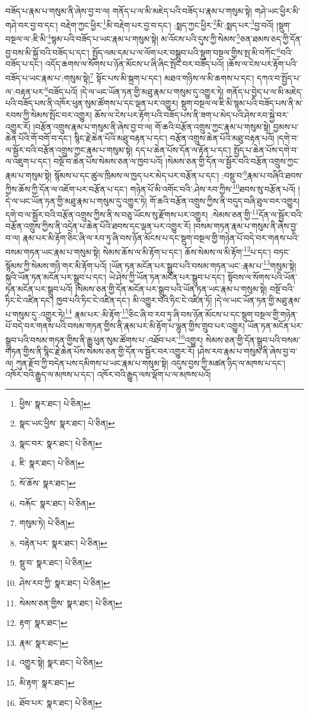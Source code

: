 བཟོད་པ་རྣམ་པ་གསུམ་ནི་ཞེས་བྱ་བ་ལ། གནོད་པ་ལ་མི་མཇེད་པའི་བཟོད་པ་རྣམ་པ་གསུམ་སྟེ། གཤེ་ཡང་ཕྱིར་མི་གཤེ་བར་བྱ་བ་དང་། བརྡེག་ཀྱང་ཕྱིར་\footnote{ཕྱིས་  སྣར་ཐང་།  པེ་ཅིན། }མི་བརྡེག་པར་བྱ་བ་དང་། :སྨད་ཀྱང་ཕྱིར་\footnote{སྣང་ཡང་ཕྱིས་  སྣར་ཐང་།  པེ་ཅིན། }མི་:སྨད་པར་\footnote{སྣང་བར་  སྣར་ཐང་།  པེ་ཅིན། }བྱ་བའོ། །སྡུག་བསྔལ་ལ་:ཇི་མི་\footnote{ཇི་  སྣར་ཐང་།  པེ་ཅིན། }སྙམ་པའི་བཟོད་པ་ཡང་རྣམ་པ་གསུམ་སྟེ། མ་འོངས་པའི་དུས་ཀྱི་སེམས་\footnote{སོ་ཆོས་  སྣར་ཐང་། }ཅན་ཐམས་ཅད་ཀྱི་དོན་བྱ་བས་མི་སྐྱོ་བའི་བཟོད་པ་དང་། སྤྱོད་ལམ་དམ་པ་ལ་ལོག་པར་བསྒྲུབ་པའི་སྡུག་བསྔལ་གྱིས་སྤ་མི་བཀོང་\footnote{བརྐོང་  སྣར་ཐང་།  པེ་ཅིན། }བའི་བཟོད་པ་དང་། འདོད་ཆགས་ལ་སོགས་པ་ཉོན་མོངས་པ་ཞི་ཞིང་སྤོང་བར་བཟོད་པའོ། །ཆོས་ལ་ངེས་པར་རྟོག་པའི་བཟོད་པ་ཡང་རྣམ་པ་:གསུམ་སྟེ།\footnote{གསུམ་ཏེ།  པེ་ཅིན། } སྟོང་པས་མི་སྐྲག་པ་དང་། མཐའ་གཉིས་ལ་མི་ཆགས་པ་དང་། དཀའ་བ་སྤྱོད་པ་ལ་:བརྟན་པར་\footnote{བརྟེན་པར་  སྣར་ཐང་།  པེ་ཅིན། }བཟོད་པའོ། །དེ་ལ་ཡང་ཡོན་ཏན་གྱི་མཐུ་རྣམ་པ་གསུམ་དུ་འགྱུར་ཏེ། གནོད་པ་བྱེད་པ་ལ་མི་མཇེད་པའི་བཟོད་པས་ནི་འཁོར་ཕུན་སུམ་ཚོགས་པ་དང་ལྡན་པར་འགྱུར། སྡུག་བསྔལ་ལ་ཇི་མི་སྙམ་པའི་བཟོད་པས་ནི་མ་རབས་ཀྱི་སེམས་སྤོང་བར་འགྱུར། ཆོས་ལ་ངེས་པར་རྟོག་པའི་བཟོད་པས་ནི་ཟག་པ་མེད་པའི་ཤེས་རབ་སྐྱེ་བར་འགྱུར་རོ། །བརྩོན་འགྲུས་རྣམ་པ་གསུམ་ནི་ཞེས་བྱ་བ་ལ། གོ་ཆའི་བརྩོན་འགྲུས་ཀྱང་རྣམ་པ་གསུམ་སྟེ། བྱམས་པ་ཆེན་པོའི་གོ་བགོ་བ་དང་། སྙིང་རྗེ་ཆེན་པོའི་མཐུ་བརྟན་པ་དང་། བརྩོན་འགྲུས་ཆེན་པོའི་མཐུ་བརྟན་པའོ། །དགེ་བ་ལ་སྦྱོར་བའི་བརྩོན་འགྲུས་ཀྱང་རྣམ་པ་གསུམ་སྟེ། དད་པ་ཆེན་པོས་དོན་ལ་རྟོན་པ་དང་། སྤྱོད་པ་ཆེན་པོས་དགེ་བ་ལ་འཇུག་པ་དང་། བསྔོ་བ་ཆེན་པོས་སེམས་ཅན་ལ་ཁྱབ་པའོ། །སེམས་ཅན་གྱི་དོན་ལ་སྦྱོར་བའི་བརྩོན་འགྲུས་ཀྱང་རྣམ་པ་གསུམ་སྟེ། སྙོམས་པ་དང་ཚུལ་ཁྲིམས་ལ་ཁྱད་པར་མེད་པར་བརྩོན་པ་དང་། :བསྡུ་བ་\footnote{སྡུ་བ་  སྣར་ཐང་།  པེ་ཅིན། }རྣམ་པ་བཞིའི་ཐབས་ཀྱིས་ཆོས་ཀྱི་དོན་ལ་འཇོག་པར་བརྩོན་པ་དང་། གཉེན་པོ་མི་འགོང་བའི་:ཤེས་རབ་ཀྱིས་\footnote{ཤེས་རབ་ཀྱི་  སྣར་ཐང་།  པེ་ཅིན། }ཐབས་སུ་བརྩོན་པའོ། །དེ་ལ་ཡང་ཡོན་ཏན་གྱི་མཐུ་རྣམ་པ་གསུམ་དུ་འགྱུར་ཏེ། གོ་ཆའི་བརྩོན་འགྲུས་ཀྱིས་ནི་བདུད་བཞི་ཐུལ་བར་འགྱུར། དགེ་བ་ལ་སྦྱོར་བའི་བརྩོན་འགྲུས་ཀྱིས་ནི་ས་བཅུ་ཡོངས་སུ་རྫོགས་པར་འགྱུར། :སེམས་ཅན་གྱི་\footnote{སེམས་ཅན་གྱིས་  སྣར་ཐང་།  པེ་ཅིན། }དོན་ལ་སྦྱོར་བའི་བརྩོན་འགྲུས་ཀྱིས་ནི་འདྲེན་པ་ཆེན་པོའི་ཐབས་དང་ལྡན་པར་འགྱུར་རོ། །བསམ་གཏན་རྣམ་པ་གསུམ་ནི་ཞེས་བྱ་བ་ལ། རྣམ་པར་མི་རྟོག་ཅིང་ཞི་ལ་རབ་ཏུ་ཞི་བས་ཉོན་མོངས་པ་དང་སྡུག་བསྔལ་གྱི་གཉེན་པོ་བདེ་བར་གནས་པའི་བསམ་གཏན་ཡང་རྣམ་པ་གསུམ་སྟེ། སེམས་ཆོས་ལ་མི་རྟོག་པ་དང་། ཆོས་སེམས་ལ་མི་རྟོག་\footnote{རྟག་  སྣར་ཐང་། }པ་དང་། བཏང་སྙོམས་ཀྱི་སེམས་གཉི་གར་མི་རྟོག་པའོ། །ཡོན་ཏན་མངོན་པར་སྒྲུབ་པའི་བསམ་གཏན་ཡང་:རྣམ་པ་\footnote{རྣམ་  སྣར་ཐང་། }གསུམ་སྟེ། སྐུའི་ཡོན་ཏན་མངོན་པར་སྒྲུབ་པ་དང་། ཡེ་ཤེས་ཀྱི་ཡོན་ཏན་མངོན་པར་སྒྲུབ་པ་དང་། སྟོབས་ལ་སོགས་པའི་ཡོན་ཏན་མངོན་པར་སྒྲུབ་པའོ། །སེམས་ཅན་གྱི་དོན་མངོན་པར་སྒྲུབ་པའི་ཡོན་ཏན་ཡང་རྣམ་པ་གསུམ་སྟེ། བསྔོ་བའི་ཏིང་ངེ་འཛིན་དང་། ཁྱབ་པའི་ཏིང་ངེ་འཛིན་དང་། མི་འགྱུར་བའི་ཏིང་ངེ་འཛིན་ཏོ། །དེ་ལ་ཡང་ཡོན་ཏན་གྱི་མཐུ་རྣམ་པ་གསུམ་དུ་:འགྱུར་ཏེ།\footnote{འགྱུར་སྟེ།  སྣར་ཐང་།  པེ་ཅིན། } རྣམ་པར་:མི་རྟོག་\footnote{མི་རྟག་  སྣར་ཐང་། }ཅིང་ཞི་བ་རབ་ཏུ་ཞི་བས་ཉོན་མོངས་པ་དང་སྡུག་བསྔལ་གྱི་གཉེན་པོ་བདེ་བར་གནས་པའི་བསམ་གཏན་གྱིས་ནི་རྣམ་པར་མི་རྟོག་པ་ལྷུན་གྱིས་གྲུབ་པར་འགྱུར། ཡོན་ཏན་མངོན་པར་སྒྲུབ་པའི་བསམ་གཏན་གྱིས་ནི་རྒྱུ་ཕུན་སུམ་ཚོགས་པ་:འཐོབ་པར་\footnote{ཐོབ་པར་  སྣར་ཐང་།  པེ་ཅིན། }འགྱུར། སེམས་ཅན་གྱི་དོན་སྒྲུབ་པའི་བསམ་གཏན་གྱིས་ནི་སྙིང་རྗེ་ཆེན་པོས་སེམས་ཅན་གྱི་དོན་ལ་སྦྱོར་བར་འགྱུར་རོ། །ཤེས་རབ་རྣམ་པ་གསུམ་ནི་ཞེས་བྱ་བ་ལ། ཀུན་རྫོབ་ཀྱི་བདེན་པས་དམིགས་པ་ཡང་རྣམ་པ་གསུམ་སྟེ། འདུས་བྱས་ཀྱི་མཚན་ཉིད་ལ་མཁས་པ་དང་། འཁོར་བའི་རྒྱུད་ལ་མཁས་པ་དང་། འཁོར་བའི་རྒྱུད་ལས་ལྡོག་པ་ལ་མཁས་པའོ། 